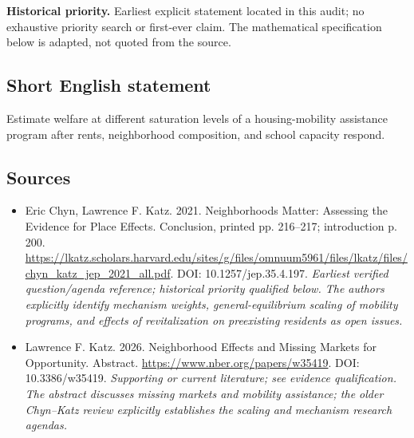 \documentclass[11pt]{article}
\begin{document}
\par\textbf{Historical priority.} Earliest explicit statement located in this audit; no exhaustive priority search or first-ever claim. The mathematical specification below is adapted, not quoted from the source.

\subsection{Short English statement}
Estimate welfare at different saturation levels of a housing-mobility assistance program after rents, neighborhood composition, and school capacity respond.

\subsection{Sources}
\begin{itemize}\raggedright
\item[\textnormal{[S1]}]\hypertarget{source:30007746:1}{} Eric Chyn, Lawrence F. Katz. 2021. Neighborhoods Matter: Assessing the Evidence for Place Effects. Conclusion, printed pp. 216–217; introduction p. 200.
\url{https://lkatz.scholars.harvard.edu/sites/g/files/omnuum5961/files/lkatz/files/chyn_katz_jep_2021_all.pdf}.
DOI: 10.1257/jep.35.4.197.
{\small\textit{Earliest verified question/agenda reference; historical priority qualified below. The authors explicitly identify mechanism weights, general-equilibrium scaling of mobility programs, and effects of revitalization on preexisting residents as open issues.}}

\item[\textnormal{[S2]}]\hypertarget{source:30007746:2}{} Lawrence F. Katz. 2026. Neighborhood Effects and Missing Markets for Opportunity. Abstract.
\url{https://www.nber.org/papers/w35419}.
DOI: 10.3386/w35419.
{\small\textit{Supporting or current literature; see evidence qualification. The abstract discusses missing markets and mobility assistance; the older Chyn–Katz review explicitly establishes the scaling and mechanism research agendas.}}
\end{itemize}
\end{document}

